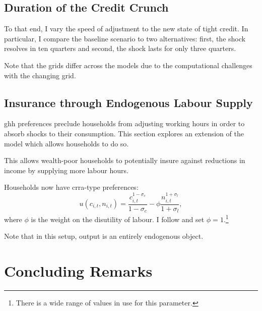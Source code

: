 \documentclass[12pt]{article} %
\numberwithin{equation}{section} %
\numberwithin{figure}{section}
\numberwithin{table}{section}
\begin{document}
\subsection{Duration of the Credit Crunch}
\label{sec:sensitivity-persistence}

To that end, I vary the speed of adjustment to the new state of tight credit. In particular, I compare the baseline scenario to two alternatives: first, the shock resolves in ten quarters and second, the shock lasts for only three quarters.

Note that the grids differ across the models due to the computational challenges with the changing grid. 

\subsection{Insurance through Endogenous Labour Supply}
\label{sec:sensitivity-end-labour}

\Gls{ghh} preferences preclude households from adjusting working hours in order to absorb shocks to their consumption. This section explores an extension of the model which allows households to do so. 

This allows wealth-poor households to potentially insure against reductions in income by supplying more labour hours.

Households now have \Gls{crra}-type preferences:
\begin{equation}
    u(c_{i,t}, n_{i,t}) = \frac{c_{i,t}^{1-\sigma_c}}{1-\sigma_c} - \phi \frac{n_{i,t}^{1+\sigma_l}}{1+\sigma_l}, \label{eq:hh-crra-utility}
\end{equation}
where $\phi$ is the weight on the disutility of labour. I follow \textcite{mckay2016} and set $\phi=1$.\footnote{There is a wide range of values in use for this parameter.}

Note that in this setup, output is an entirely endogenous object. 

\section{Concluding Remarks}
\label{sec:conclusion}
\end{document}
